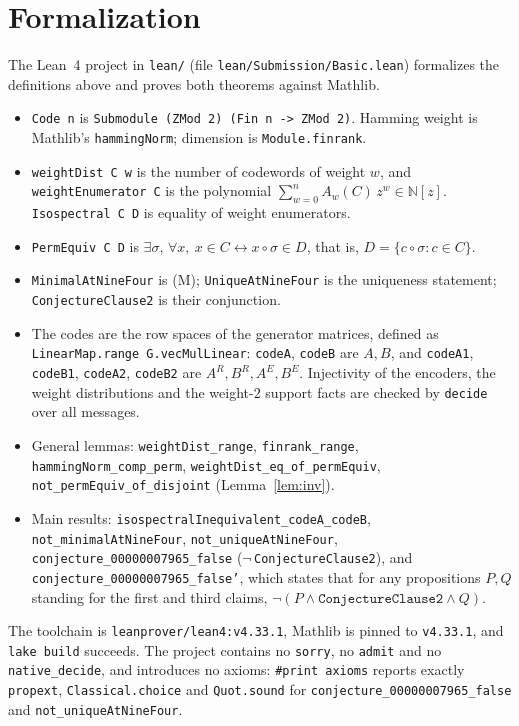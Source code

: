 \documentclass[11pt]{article}
\theoremstyle{plain}
\theoremstyle{definition}
\theoremstyle{remark}
\begin{document}
\section{Formalization}

The Lean~4 project in \texttt{lean/} (file \texttt{lean/Submission/Basic.lean})
formalizes the definitions above and proves both theorems against Mathlib.
\begin{itemize}
  \item \texttt{Code n} is \texttt{Submodule (ZMod 2) (Fin n -> ZMod 2)}. Hamming
    weight is Mathlib's \texttt{hammingNorm}; dimension is
    \texttt{Module.finrank}.
  \item \texttt{weightDist C w} is the number of codewords of weight $w$, and
    \texttt{weightEnumerator C} is the polynomial
    $\sum_{w=0}^n A_w(C)\,z^w\in\mathbb N[z]$. \texttt{Isospectral C D} is
    equality of weight enumerators.
  \item \texttt{PermEquiv C D} is $\exists\sigma$,
    $\forall x,\ x\in C\leftrightarrow x\circ\sigma\in D$, that is,
    $D=\{c\circ\sigma:c\in C\}$.
  \item \texttt{MinimalAtNineFour} is (M); \texttt{UniqueAtNineFour} is the
    uniqueness statement; \texttt{ConjectureClause2} is their conjunction.
  \item The codes are the row spaces of the generator matrices, defined as
    \texttt{LinearMap.range G.vecMulLinear}: \texttt{codeA}, \texttt{codeB} are
    $A,B$, and \texttt{codeA1}, \texttt{codeB1}, \texttt{codeA2}, \texttt{codeB2}
    are $A^R,B^R,A^E,B^E$. Injectivity of the encoders, the
    weight distributions and the weight-$2$ support facts are checked by
    \texttt{decide} over all messages.
  \item General lemmas: \texttt{weightDist\_range},
    \texttt{finrank\_range}, \texttt{hammingNorm\_comp\_perm},
    \texttt{weightDist\_eq\_of\_permEquiv}, \texttt{not\_permEquiv\_of\_disjoint}
    (Lemma~\ref{lem:inv}).
  \item Main results: \texttt{isospectralInequivalent\_codeA\_codeB},
    \texttt{not\_minimalAtNineFour}, \texttt{not\_uniqueAtNineFour},
    \texttt{conjecture\_00000007965\_false} ($\lnot$\,\texttt{ConjectureClause2}),
    and \texttt{conjecture\_00000007965\_false'}, which states that for any
    propositions $P,Q$ standing for the first and third claims,
    $\lnot(P\wedge\texttt{ConjectureClause2}\wedge Q)$.
\end{itemize}
The toolchain is \texttt{leanprover/lean4:v4.33.1}, Mathlib is pinned to
\texttt{v4.33.1}, and \texttt{lake build} succeeds. The project contains no
\texttt{sorry}, no \texttt{admit} and no \texttt{native\_decide}, and introduces no
axioms: \texttt{\#print axioms} reports exactly \texttt{propext},
\texttt{Classical.choice} and \texttt{Quot.sound} for
\texttt{conjecture\_00000007965\_false} and \texttt{not\_uniqueAtNineFour}.
\end{document}
